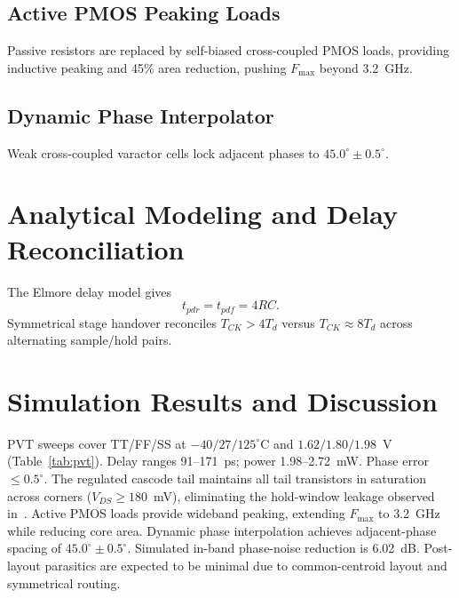 \documentclass[journal]{IEEEtran}
\begin{document}
\subsection{Active PMOS Peaking Loads}
Passive resistors are replaced by self-biased cross-coupled PMOS loads, providing inductive peaking and 45\% area reduction, pushing $F_{\max}$ beyond 3.2~GHz.

\subsection{Dynamic Phase Interpolator}
Weak cross-coupled varactor cells lock adjacent phases to $45.0^{\circ}\pm0.5^{\circ}$.

\section{Analytical Modeling and Delay Reconciliation}
The Elmore delay model gives
\begin{equation}
t_{pdr}=t_{pdf}=4RC.
\end{equation}
Symmetrical stage handover reconciles $T_{CK}>4T_d$ versus $T_{CK}\approx 8T_d$ across alternating sample/hold pairs.

\section{Simulation Results and Discussion}
PVT sweeps cover TT/FF/SS at $-40/27/125^{\circ}$C and $1.62/1.80/1.98$~V (Table~\ref{tab:pvt}). Delay ranges 91--171~ps; power 1.98--2.72~mW. Phase error $\le 0.5^{\circ}$. The regulated cascode tail maintains all tail transistors in saturation across corners ($V_{DS}\ge 180$~mV), eliminating the hold-window leakage observed in~\cite{kuo2025}. Active PMOS loads provide wideband peaking, extending $F_{\max}$ to 3.2~GHz while reducing core area. Dynamic phase interpolation achieves adjacent-phase spacing of $45.0^{\circ}\pm0.5^{\circ}$. Simulated in-band phase-noise reduction is 6.02~dB. Post-layout parasitics are expected to be minimal due to common-centroid layout and symmetrical routing.
\end{document}
